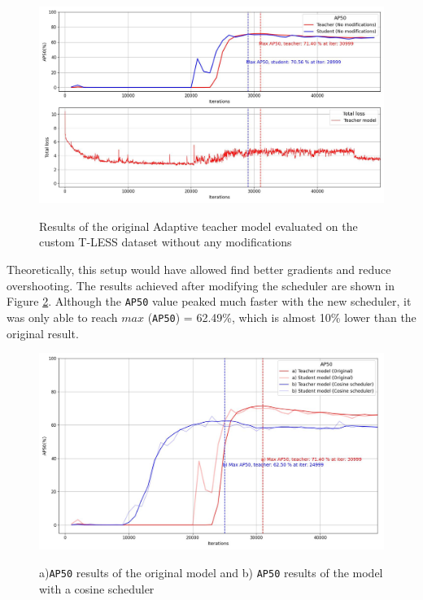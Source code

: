 \documentclass[english, 12pt, a4paper, elec, utf8, a-1b, online]{aaltothesis}
\begin{document}
\begin{figure}[htb]
	\begin{center}
		\includegraphics[width=16cm]{./loss&AP50_original.jpg}
	\end{center}
	\caption{Results of the original Adaptive teacher model evaluated on the custom T-LESS dataset without any modifications}
	\begin{center}
		\label{original_experiment}
	\end{center}
\end{figure}
\FloatBarrier
Theoretically, this setup would have allowed find better gradients and reduce overshooting. The results achieved after modifying the scheduler are shown in Figure \ref{comparison_1}. Although the \texttt{AP50} value peaked much faster with the new scheduler, it was only able to reach $max$ (\texttt{AP50}) = 62.49\%, which is almost 10\% lower than the original result.    



\begin{figure}[htb]
	\begin{center}
		\includegraphics[width=14cm]{./AP50_scheduler.jpg}
	\end{center}
	\caption{a)\texttt{AP50} results of the original model and b) \texttt{AP50} results of the model with a cosine scheduler}
	\begin{center}
		\label{comparison_1}
	\end{center}
\end{figure}
\FloatBarrier
\end{document}
